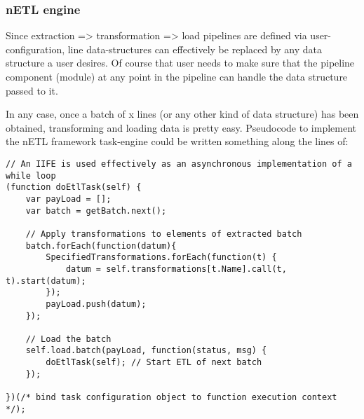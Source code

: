 \subsubsection{nETL engine}
Since extraction => transformation => load pipelines are defined via user-configuration, line data-structures can effectively be replaced by any data structure a user desires. Of course that user needs to make sure that the pipeline component (module) at any point in the pipeline can handle the data structure passed to it.

In any case, once a batch of x lines (or any other kind of data structure) has been obtained, transforming and loading data is pretty easy. Pseudocode to implement the nETL framework task-engine could be written something along the lines of:

\begin{verbatim}
// An IIFE is used effectively as an asynchronous implementation of a while loop
(function doEtlTask(self) {
    var payLoad = [];
    var batch = getBatch.next();

    // Apply transformations to elements of extracted batch
    batch.forEach(function(datum){
        SpecifiedTransformations.forEach(function(t) {
            datum = self.transformations[t.Name].call(t, t).start(datum);
        });
        payLoad.push(datum);
    });

    // Load the batch
    self.load.batch(payLoad, function(status, msg) {
        doEtlTask(self); // Start ETL of next batch
    });

})(/* bind task configuration object to function execution context */);
\end{verbatim}
